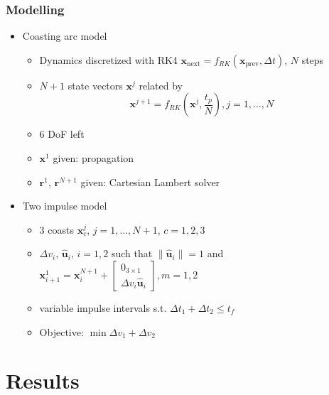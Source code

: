 \documentclass{beamer}
\begin{document}
\begin{frame}
    \frametitle{Modelling}

    \begin{itemize}\pause
        \item Coasting arc model\pause
        \begin{itemize}
            \item Dynamics discretized with RK4 \(\mathbf{x}_{\text{next}} = f_{RK}(\mathbf{x}_{\text{prev}}, \Delta t)\), \(N\) steps\pause
            \item \(N+1\) state vectors \(\mathbf{x}^j\) related by
            \begin{equation}
                 \mathbf{x}^{j+1} = f_{RK}(\mathbf{x}^j, \frac{t_p}{N}), j = 1, \dots, N
            \end{equation}\pause
            \item 6 DoF left\pause
            \item \(\mathbf{x}^1\) given: propagation\pause
            \item \(\mathbf{r}^1\), \(\mathbf{r}^{N+1}\) given: Cartesian Lambert solver\pause
        \end{itemize}
        \item Two impulse model\pause
        \begin{itemize}
            \item 3 coasts \(\mathbf{x}^j_c\), \(j=1,\dots,N+1\), \(c=1,2,3\)\pause
            \item \(\Delta v_i\), \(\hat{\mathbf{u}}_i\), \(i = 1, 2\) such that \(\lVert \hat{\mathbf{u}}_i \rVert = 1\) and \(\mathbf{x}_{i+1}^1 = \mathbf{x}_i^{N+1} + \begin{bmatrix}
                0_{3\times1} \\ \Delta v_i \hat{\mathbf{u}}_i
            \end{bmatrix}, m=1, 2\)\pause
            \item variable impulse intervals s.t. \(\Delta t_1 + \Delta t_2 \leq t_f\)\pause
            \item Objective: \(\min \Delta v_1 + \Delta v_2\)
        \end{itemize}
    \end{itemize}
\end{frame}

\section{Results}
\end{document}
